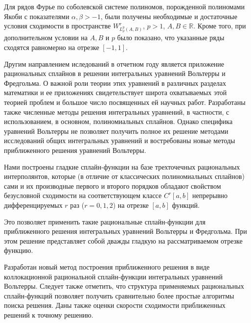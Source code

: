 Для рядов Фурье по соболевской системе полиномов, порожденной полиномами Якоби с показателями $\alpha, \beta  > -1$, были получены необходимые и достаточные условия сходимости в пространстве $W^r_{L^p_\rho(A,B)}$, $p > 1$, $A, B \in \mathbb{R}$. Кроме того, при дополнительном условии на $A, B$ и $p$ было показано, что  указанные ряды сходятся равномерно на отрезке $[-1,1]$.


Другим направлением иследований в отчетном году является приложение рациональных сплайнов в решении интегральных уравнений Вольтерры и Фредгольма. О важной роли теории этих уравнений в различных разделах математики и ее приложениях свидетельствует широта охватываемых этой теорией проблем и большое число посвященных ей научных работ. Разработаны также численные методы решения интегральных уравнений, в частности, с использованием, в основном, полиномиальных сплайнов. Однако специфика уравнений Вольтерры не позволяет получить полное их решение методами исследований общих интегральных уравнений и востребованы новые методы приближенного решения уравнений Вольтерры.

Нами построены гладкие сплайн-функции на базе трехточечных рациональных
интерполянтов, которые (в отличие от классических полиномиальных сплайнов)
сами и их производные первого и второго
порядков обладают свойством безусловной сходимости
на соответствующем классе $C^r[a,b]$ непрерывно дифференцируемых $r$ раз
($r=0,1,2$) на отрезке $[a,b]$ функций.

Это позволяет применить такие рациональные сплайн-функции для приближенного
решения интегральных уравнений Вольтерры и Фредгольма.
При этом решение представляет собой дважды гладкую на рассматриваемом отрезке
функцию.

Разработан новый метод построения
приближенного решения в виде коллокационной рациональной сплайн-функции
интегральных уравнений Вольтерры.
Следует также отметить, что структура применяемых рациональных сплайн-функций
позволяет получить сравнительно более простые алгоритмы поиска решения.
Даны также
оценки скорости сходимости приближенных решений к точному решению.